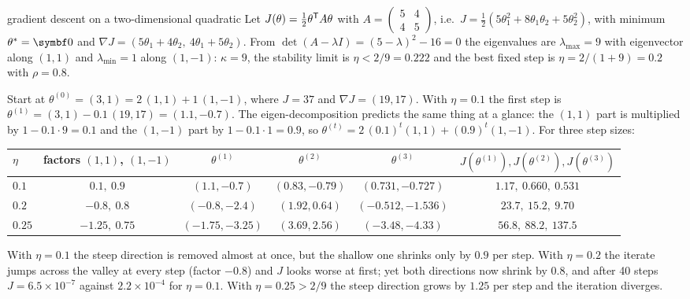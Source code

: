 \documentclass[11pt]{article}
\begin{document}
\begin{worked}{gradient descent on a two-dimensional quadratic}
Let $J(\theta) = \frac12\theta^{\mathsf{T}} A\theta$ with $A = \begin{pmatrix} 5 & 4 \\ 4 & 5\end{pmatrix}$, i.e.\
$J = \frac12(5\theta_1^2 + 8\theta_1\theta_2 + 5\theta_2^2)$, with minimum $\theta^* = \vect{0}$ and
$\nabla J = (5\theta_1 + 4\theta_2,\ 4\theta_1 + 5\theta_2)$. From $\det(A - \lambda I) = (5 - \lambda)^2 - 16 = 0$ the
eigenvalues are $\lambda_{\max} = 9$ with eigenvector along $(1, 1)$ and $\lambda_{\min} = 1$ along $(1, -1)$: $\kappa = 9$, the
stability limit is $\eta < 2/9 = 0.222$ and the best fixed step is $\eta = 2/(1 + 9) = 0.2$ with $\rho = 0.8$.

Start at $\theta^{(0)} = (3, 1) = 2\,(1, 1) + 1\,(1, -1)$, where $J = 37$ and $\nabla J = (19, 17)$. With $\eta = 0.1$ the
first step is $\theta^{(1)} = (3, 1) - 0.1\,(19, 17) = (1.1, -0.7)$. The eigen-decomposition predicts the same thing at a
glance: the $(1, 1)$ part is multiplied by $1 - 0.1 \cdot 9 = 0.1$ and the $(1, -1)$ part by $1 - 0.1 \cdot 1 = 0.9$,
so $\theta^{(t)} = 2\,(0.1)^t(1, 1) + (0.9)^t(1, -1)$. For three step sizes:
\begin{center}\small
\begin{tabular}{@{}lccccc@{}}
\toprule
$\eta$ & factors $(1, 1)$, $(1, -1)$ & $\theta^{(1)}$ & $\theta^{(2)}$ & $\theta^{(3)}$ & $J(\theta^{(1)}), J(\theta^{(2)}), J(\theta^{(3)})$ \\
\midrule
$0.1$  & $0.1,\ 0.9$   & $(1.1, -0.7)$   & $(0.83, -0.79)$  & $(0.731, -0.727)$ & $1.17,\ 0.660,\ 0.531$ \\
$0.2$  & $-0.8,\ 0.8$  & $(-0.8, -2.4)$  & $(1.92, 0.64)$   & $(-0.512, -1.536)$ & $23.7,\ 15.2,\ 9.70$ \\
$0.25$ & $-1.25,\ 0.75$ & $(-1.75, -3.25)$ & $(3.69, 2.56)$ & $(-3.48, -4.33)$ & $56.8,\ 88.2,\ 137.5$ \\
\bottomrule
\end{tabular}
\end{center}
With $\eta = 0.1$ the steep direction is removed almost at once, but the shallow one shrinks only by $0.9$ per step.
With $\eta = 0.2$ the iterate jumps across the valley at every step (factor $-0.8$) and $J$ looks worse at first;
yet both directions now shrink by $0.8$, and after 40 steps $J = 6.5 \times 10^{-7}$ against $2.2 \times 10^{-4}$ for
$\eta = 0.1$. With $\eta = 0.25 > 2/9$ the steep direction grows by $1.25$ per step and the iteration diverges.
\end{worked}
\end{document}
